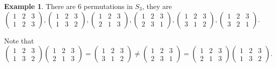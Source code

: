 \documentclass[12pt]{book}
\theoremstyle{definition}
\newtheorem{example}{Example}[section]
\theoremstyle{remark}
\begin{document}
				\begin{example}
					There are 6 permutations in $S_3$, they are
					\begin{equation*}
					\begin{pmatrix}
					1 & 2 & 3\\
					1 & 2 & 3
					\end{pmatrix}, 
					\begin{pmatrix}
					1 & 2 & 3\\
					1 & 3 & 2
					\end{pmatrix}, 
					\begin{pmatrix}
					1 & 2 & 3\\
					2 & 1 & 3
					\end{pmatrix}, 
					\begin{pmatrix}
					1 & 2 & 3\\
					2 & 3 & 1
					\end{pmatrix}, 
					\begin{pmatrix}
					1 & 2 & 3\\
					3 & 1 & 2
					\end{pmatrix},
					\begin{pmatrix}
					1 & 2 & 3\\
					3 & 2 & 1
					\end{pmatrix}.
					\end{equation*}
				\end{example}
			Note that
			\begin{equation*}
				\begin{pmatrix}
					1 & 2 & 3 \\
					1 & 3 & 2
				\end{pmatrix}
				\begin{pmatrix}
				1 & 2 & 3 \\
				2 & 1 & 3
				\end{pmatrix}
				= \begin{pmatrix}
				1 & 2 & 3 \\
				3 & 1 & 2
				\end{pmatrix}
				\neq
				\begin{pmatrix}
				1 & 2 & 3 \\
				2 & 3 & 1
				\end{pmatrix}
				= 	\begin{pmatrix}
				1 & 2 & 3 \\
				2 & 1 & 3
				\end{pmatrix}
				\begin{pmatrix}
				1 & 2 & 3 \\
				1 & 3 & 2
				\end{pmatrix}.
			\end{equation*}
\end{document}
